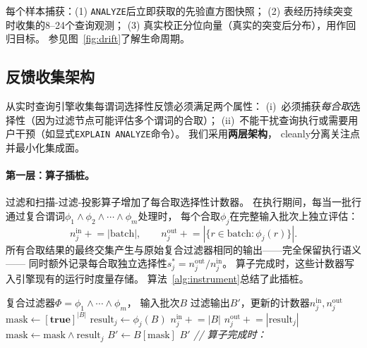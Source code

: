 \documentclass[runningheads]{llncs}
\begin{document}
每个样本捕获：(1) \texttt{ANALYZE}后立即获取的先验直方图快照；
(2) 表经历持续突变时收集的8--24个查询观测；
(3) 真实校正分位向量（真实的突变后分布），用作回归目标。
参见图~\ref{fig:drift}了解生命周期。

\subsection{反馈收集架构}
\label{sec:feedback}

从实时查询引擎收集每谓词选择性反馈必须满足两个属性：
(i)~必须捕获\emph{每合取}选择性（因为过滤节点可能评估多个谓词的合取）；
(ii)~不能干扰查询执行或需要用户干预（如显式\texttt{EXPLAIN ANALYZE}命令）。
我们采用\textbf{两层架构}， cleanly分离关注点并最小化集成面。

\paragraph{第一层：算子插桩。}
过滤和扫描-过滤-投影算子增加了每合取选择性计数器。
在执行期间，每当一批行通过复合谓词$\phi_1 \wedge \phi_2 \wedge \cdots \wedge \phi_m$处理时，
每个合取$\phi_j$在完整输入批次上独立评估：
\[
  n_j^{\text{in}} \mathrel{+}= |\text{batch}|, \qquad
  n_j^{\text{out}} \mathrel{+}= |\{r \in \text{batch} : \phi_j(r)\}|.
\]
所有合取结果的最终交集产生与原始复合过滤器相同的输出——完全保留执行语义——
同时额外记录每合取独立选择性$s^*_j = n_j^{\text{out}} / n_j^{\text{in}}$。
算子完成时，这些计数器写入引擎现有的运行时度量存储。
算法~\ref{alg:instrument}总结了此插桩。

\begin{algorithm}[t]
\caption{每合取算子插桩}
\label{alg:instrument}
\begin{algorithmic}[1]
\Require 复合过滤器$\Phi = \phi_1 \wedge \cdots \wedge \phi_m$，
         输入批次$B$
\Ensure  过滤输出$B'$，更新的计数器$n_j^{\text{in}}, n_j^{\text{out}}$
\State $\text{mask} \leftarrow [\textbf{true}]^{|B|}$
  \State $\text{result}_j \leftarrow \phi_j(B)$
  \State $n_j^{\text{in}} \mathrel{+}= |B|$
  \State $n_j^{\text{out}} \mathrel{+}= |\text{result}_j|$
  \State $\text{mask} \leftarrow \text{mask} \wedge \text{result}_j$
\EndFor
\State $B' \leftarrow B[\text{mask}]$
\State \Return $B'$
\Statex
\Statex \textit{// 算子完成时：}
  \State {}
  \State {}
\EndFor
\end{algorithmic}
\end{algorithm}
\end{document}
